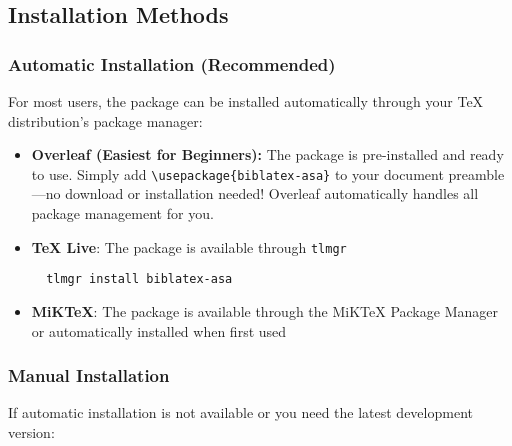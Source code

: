 \documentclass[11pt,a4paper]{ltxdoc}
\begin{document}
\subsection{Installation Methods}

\subsubsection{Automatic Installation (Recommended)}

For most users, the package can be installed automatically through your TeX distribution's package manager:

\begin{itemize}
  \item \textbf{Overleaf (Easiest for Beginners):} The package is pre-installed and ready to use. Simply add \texttt{\textbackslash usepackage\{biblatex-asa\}} to your document preamble—no download or installation needed! Overleaf automatically handles all package management for you.

  \item \textbf{TeX Live}: The package is available through \texttt{tlmgr}
  \begin{verbatim}
  tlmgr install biblatex-asa
  \end{verbatim}
  
  \item \textbf{MiKTeX}: The package is available through the MiKTeX Package Manager or automatically installed when first used
\end{itemize}

\subsubsection{Manual Installation}

If automatic installation is not available or you need the latest development version:
\end{document}
